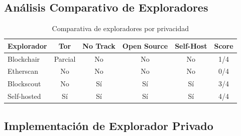 \documentclass[11pt,a4paper,twoside]{book}
\theoremstyle{definition}
\theoremstyle{remark}
\begin{document}
\subsection{Análisis Comparativo de Exploradores}

\begin{table}[htbp]
\centering
\small
\begin{tabular}{lccccc}
\toprule
\textbf{Explorador} & \textbf{Tor} & \textbf{No Track} & \textbf{Open Source} & \textbf{Self-Host} & \textbf{Score} \\
\midrule
Blockchair & Parcial & No & No & No & 1/4 \\
Etherscan & No & No & No & No & 0/4 \\
Blockscout & No & Sí & Sí & Sí & 3/4 \\
Self-hosted & Sí & Sí & Sí & Sí & 4/4 \\
\bottomrule
\end{tabular}
\caption{Comparativa de exploradores por privacidad}
\end{table}

\subsection{Implementación de Explorador Privado}
\end{document}

